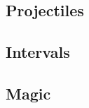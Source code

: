 \documentclass[a4paper,openany]{book}
\begin{document}
\begin{multicols}{2}


\commonArmourChart

\mentalSkillChart

\subsection*{Projectiles}



\subsection*{Intervals}



\subsection*{Magic}



\end{multicols}
\end{document}

